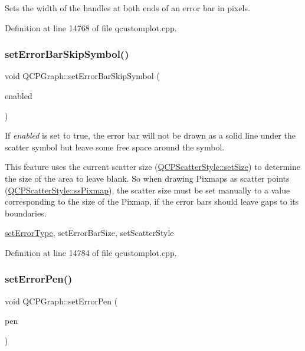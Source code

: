 Sets the width of the handles at both ends of an error bar in pixels. 

Definition at line 14768 of file qcustomplot.\+cpp.

\mbox{\label{class_q_c_p_graph_ab1c1ee03d8dd94676a564e5e5f11aac2}} 
\subsubsection{\texorpdfstring{set\+Error\+Bar\+Skip\+Symbol()}{setErrorBarSkipSymbol()}}
{\footnotesize\ttfamily void Q\+C\+P\+Graph\+::set\+Error\+Bar\+Skip\+Symbol (\begin{DoxyParamCaption}\item[{bool}]{enabled }\end{DoxyParamCaption})}

If {\itshape enabled} is set to true, the error bar will not be drawn as a solid line under the scatter symbol but leave some free space around the symbol.

This feature uses the current scatter size (\hyperlink{class_q_c_p_scatter_style_aaefdd031052892c4136129db68596e0f}{Q\+C\+P\+Scatter\+Style\+::set\+Size}) to determine the size of the area to leave blank. So when drawing Pixmaps as scatter points (\hyperlink{class_q_c_p_scatter_style_adb31525af6b680e6f1b7472e43859349a8718b849ca7c307b07b8e091efb0c31e}{Q\+C\+P\+Scatter\+Style\+::ss\+Pixmap}), the scatter size must be set manually to a value corresponding to the size of the Pixmap, if the error bars should leave gaps to its boundaries.

\hyperlink{class_q_c_p_graph_ac3614d799c3894f2bc646e99c7f73d38}{set\+Error\+Type}, set\+Error\+Bar\+Size, set\+Scatter\+Style 

Definition at line 14784 of file qcustomplot.\+cpp.

\mbox{\label{class_q_c_p_graph_abd4c7f81939e10776ea64603a704f22a}} 
\subsubsection{\texorpdfstring{set\+Error\+Pen()}{setErrorPen()}}
{\footnotesize\ttfamily void Q\+C\+P\+Graph\+::set\+Error\+Pen (\begin{DoxyParamCaption}\item[{const Q\+Pen \&}]{pen }\end{DoxyParamCaption})}

